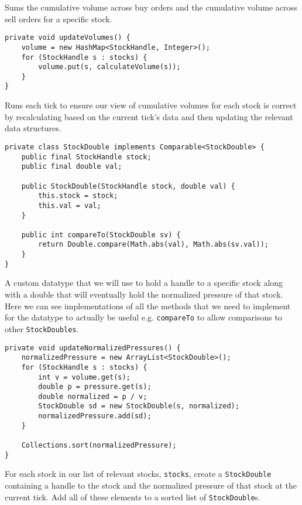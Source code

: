 \documentclass[11pt]{article}
\begin{document}
Sums the cumulative volume across buy orders and the cumulative volume across sell orders for a specific stock.\\
\begin{lstlisting}
private void updateVolumes() {
	volume = new HashMap<StockHandle, Integer>();
	for (StockHandle s : stocks) {
		volume.put(s, calculateVolume(s));
	}
}
\end{lstlisting}
Runs each tick to ensure our view of cumulative volumes for each stock is correct by recalculating based on the current tick's data and then updating the relevant data structures.\newpage
\begin{lstlisting}
private class StockDouble implements Comparable<StockDouble> {
	public final StockHandle stock;
	public final double val;
	
	public StockDouble(StockHandle stock, double val) {
		this.stock = stock;
		this.val = val;
	}
	
	public int compareTo(StockDouble sv) {
		return Double.compare(Math.abs(val), Math.abs(sv.val));
	}
}
\end{lstlisting}
A custom datatype that we will use to hold a handle to a specific stock along with a double that will eventually hold the normalized pressure of that stock. Here we can see implementations of all the methods that we need to implement for the datatype to actually be useful e.g. \texttt{compareTo} to allow comparisons to other \texttt{StockDoubles}.\\
\begin{lstlisting}
private void updateNormalizedPressures() {
	normalizedPressure = new ArrayList<StockDouble>();
	for (StockHandle s : stocks) {
		int v = volume.get(s);
		double p = pressure.get(s);
		double normalized = p / v;
		StockDouble sd = new StockDouble(s, normalized);
		normalizedPressure.add(sd);
	}
	
	Collections.sort(normalizedPressure);
}
\end{lstlisting}
For each stock in our list of relevant stocks, \texttt{stocks}, create a \texttt{StockDouble} containing a handle to the stock and the normalized pressure of that stock at the current tick. Add all of these elements to a sorted list of \texttt{StockDouble}s.\newpage
\end{document}
